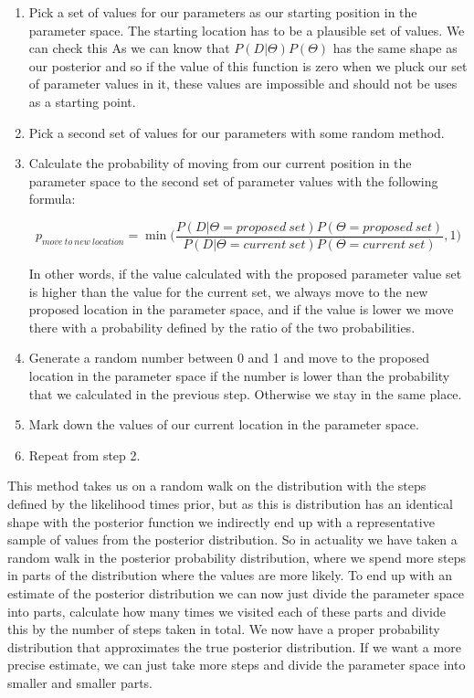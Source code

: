 \documentclass[12pt,a4paper,leqno]{report}
\theoremstyle{plain}
\theoremstyle{definition}
\theoremstyle{remark}
\begin{document}
\begin{enumerate}
    \item Pick a set of values for our parameters as our starting position in
          the parameter space. The starting location has to be a plausible set
          of values. We can check this As we can know that
          \(P(D|\Theta)P(\Theta)\) has the same shape as our posterior and so if
          the value of this function is zero when we pluck our set of
          parameter values in it, these values are impossible and should not be
          uses as a starting point.
    \item Pick a second set of values for our parameters with some random method.
    \item Calculate the probability of moving from our current position in the
          parameter space to the second set of parameter values with the
          following formula:

          \begin{def}\label{randomwalk}
              \begin{equation}
                  p_{move\ to\ new\ location} = \min \bigg(\frac{P(D|\Theta = proposed\ set)P(\Theta = proposed\ set)}{P(D|\Theta = current\ set)P(\Theta = current\ set)}, 1 \bigg)
              \end{equation}
          \end{def}
          In other words, if the value calculated with the proposed parameter
          value set is higher than the value for the current set, we always move
          to the new proposed location in the parameter space, and if the value
          is lower we move there with a probability defined by the ratio of the
          two probabilities.
    \item Generate a random number between 0 and 1 and move to the proposed
          location in the parameter space if the number is lower than the
          probability that we calculated in the previous step. Otherwise we stay
          in the same place.
    \item Mark down the values of our current location in the parameter space.
    \item Repeat from step 2.

\end{enumerate}

This method takes us on a random walk on the distribution with the steps defined
by the likelihood times prior, but as this is distribution has an identical shape
with the posterior function we indirectly end up with a representative sample of
values from the posterior distribution. So in actuality we have taken a random
walk in the posterior probability distribution, where we spend more steps in
parts of the distribution where the values are more likely. To end up with an
estimate of the posterior distribution we can now just divide the parameter
space into parts, calculate how many times we visited each of these parts and
divide this by the number of steps taken in total. We now have a proper probability
distribution that approximates the true posterior distribution. If we want a
more precise estimate, we can just take more steps and divide the parameter
space into smaller and smaller parts.
\end{document}
